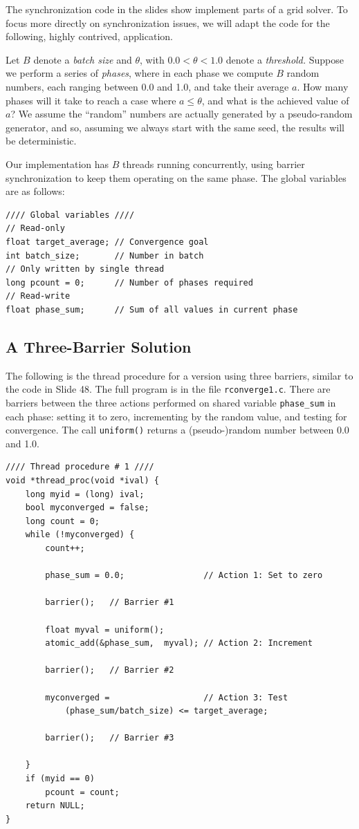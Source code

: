 \documentclass[11pt]{article}
\begin{document}
The synchronization code in the slides show implement parts of a grid
solver.  To focus more directly on synchronization issues, we will
adapt the code for the following, highly contrived, application.

Let $B$ denote a {\em batch size} and $\theta$, with $0.0 < \theta <
1.0$ denote a {\em threshold.}  Suppose we perform a series of {\em
  phases}, where in each phase we compute $B$ random numbers, each ranging between 0.0 and 1.0, and take
their average $a$.  How many phases will it take to reach a case where
$a \leq \theta$, and what is the achieved value of $a$?  We assume the
``random'' numbers are actually generated by a pseudo-random
generator, and so, assuming we always start with the same seed, the
results will be deterministic.

Our implementation has $B$ threads running concurrently, using barrier
synchronization to keep them operating on the same phase.  The global variables are as follows:

\begin{lstlisting}
//// Global variables ////
// Read-only
float target_average; // Convergence goal
int batch_size;       // Number in batch
// Only written by single thread
long pcount = 0;      // Number of phases required
// Read-write  
float phase_sum;      // Sum of all values in current phase
\end{lstlisting}

\subsection*{A Three-Barrier Solution}


The following is the thread procedure for a version using three
barriers, similar to the code in Slide 48.  The full program is in the
file {\tt rconverge1.c}.  There are barriers between the three actions
performed on shared variable \texttt{phase\_sum} in each phase:
setting it to zero, incrementing by the random value, and testing for
convergence.  The call \texttt{uniform()} returns a (pseudo-)random
number between 0.0 and 1.0.

\newpage
\begin{lstlisting}
//// Thread procedure # 1 ////
void *thread_proc(void *ival) {
    long myid = (long) ival;
    bool myconverged = false;
    long count = 0;
    while (!myconverged) {
        count++;

        phase_sum = 0.0;                // Action 1: Set to zero

        barrier();   // Barrier #1

        float myval = uniform();
        atomic_add(&phase_sum,  myval); // Action 2: Increment

        barrier();   // Barrier #2

        myconverged =                   // Action 3: Test
            (phase_sum/batch_size) <= target_average;

        barrier();   // Barrier #3

    }
    if (myid == 0)
        pcount = count;
    return NULL;
}
\end{lstlisting}
\end{document}
